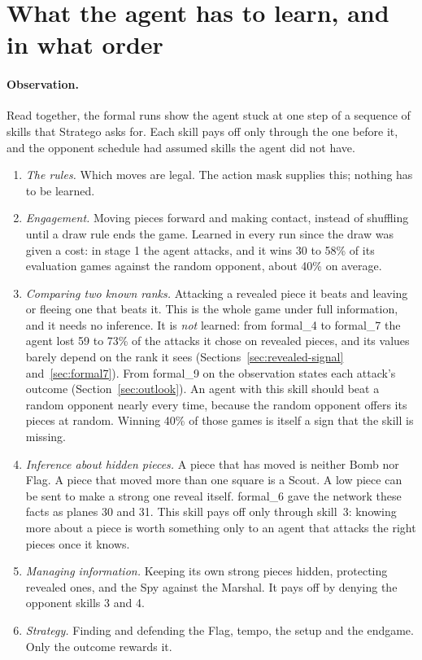\section{What the agent has to learn, and in what order}
\label{sec:skill-ladder}

\paragraph{Observation.} Read together, the formal runs show the agent stuck at one step of a
sequence of skills that Stratego asks for. Each skill pays off only through the one before it,
and the opponent schedule had assumed skills the agent did not have.
\begin{enumerate}
  \item \emph{The rules.} Which moves are legal. The action mask supplies this; nothing has
        to be learned.
  \item \emph{Engagement.} Moving pieces forward and making contact, instead of shuffling until
        a draw rule ends the game. Learned in every run since the draw was given a cost: in stage 1
        the agent attacks, and it wins 30 to 58\% of its evaluation games against the random
        opponent, about 40\% on average.
  \item \emph{Comparing two known ranks.} Attacking a revealed piece it beats and leaving or
        fleeing one that beats it. This is the whole game under full information, and it needs
        no inference. It is \emph{not} learned: from formal\_4 to formal\_7 the agent lost 59 to
        73\% of the attacks it chose on revealed pieces, and its values barely depend on the rank it
        sees (Sections~\ref{sec:revealed-signal} and~\ref{sec:formal7}). From formal\_9 on the
        observation states each attack's outcome (Section~\ref{sec:outlook}). An agent with this skill
        should beat a random opponent nearly every time, because the random opponent offers its
        pieces at random. Winning 40\% of those games is itself a sign that the skill is missing.
  \item \emph{Inference about hidden pieces.} A piece that has moved is neither Bomb nor Flag. A
        piece that moved more than one square is a Scout. A low piece can be sent to make a
        strong one reveal itself. formal\_6 gave the network these facts as planes 30 and 31.
        This skill pays off only through skill~3: knowing more about a piece is worth something
        only to an agent that attacks the right pieces once it knows.
  \item \emph{Managing information.} Keeping its own strong pieces hidden, protecting revealed
        ones, and the Spy against the Marshal. It pays off by denying the opponent skills 3
        and 4.
  \item \emph{Strategy.} Finding and defending the Flag, tempo, the setup and the endgame. Only
        the outcome rewards it.
\end{enumerate}

